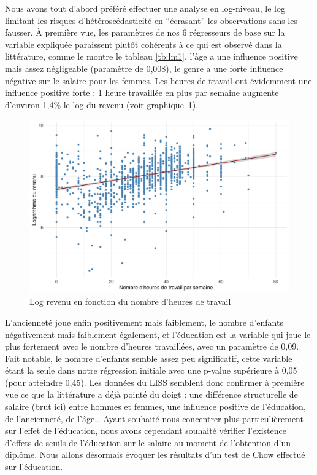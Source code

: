 \documentclass[a4paper, french, 11 pt]{article}\usepackage[]{graphicx}\usepackage[]{xcolor}
\begin{document}
Nous avons tout d’abord préféré effectuer une analyse en log-niveau, le log limitant les risques d’hétéroscédasticité en \enquote{écrasant} les observations sans les fausser. À première vue, les paramètres de nos 6 régresseurs de base sur la variable expliquée paraissent plutôt cohérents à ce qui est observé dans la littérature, comme le montre le tableau \ref{tb:lm1}, l’âge a une influence positive mais assez négligeable (paramètre de 0,008), le genre a une forte influence négative sur le salaire pour les femmes. Les heures de travail ont évidemment une influence positive forte : 1 heure travaillée en plus par semaine augmente d’environ 1,4\% le log du revenu (voir graphique~\ref{fig:heureslogrevenu}).



\begin{figure}[h]
\center
\includegraphics[width=0.7\linewidth]{figure/heures_logrevenu.pdf}
\caption{Log revenu en fonction du nombre d'heures de travail\label{fig:heureslogrevenu}}
\end{figure}

L’ancienneté joue enfin positivement mais faiblement, le nombre d’enfants négativement mais faiblement également, et l’éducation est la variable qui joue le plus fortement avec le nombre d’heures travaillées, avec un paramètre de 0,09. Fait notable, le nombre d’enfants semble assez peu significatif, cette variable étant la seule dans notre régression initiale avec une p-value supérieure à 0,05 (pour atteindre 0,45).
        Les données du LISS semblent donc confirmer à première vue ce que la littérature a déjà pointé du doigt : une différence structurelle de salaire (brut ici) entre hommes et femmes, une influence positive de l’éducation, de l’ancienneté, de l’âge… Ayant souhaité nous concentrer plus particulièrement sur l’effet de l’éducation, nous avons cependant souhaité vérifier l’existence d'effets de seuils de l’éducation sur le salaire au moment de l’obtention d’un diplôme. Nous allons désormais évoquer les résultats d’un test de Chow effectué sur l’éducation. 
\end{document}
